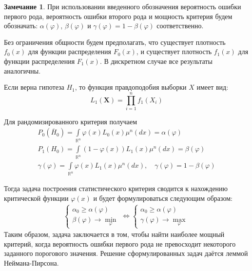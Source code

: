 \documentclass[oneside,final,14pt]{extreport}
\theoremstyle{plain}
\theoremstyle{definition}
\newtheorem*{rmrk}{Замечание}
\theoremstyle{named}
\begin{document}
\begin{rmrk}
При использовании введенного обозначения вероятность ошибки первого рода, вероятность ошибки второго рода и мощность критерия будем обозначать: $\alpha(\varphi)$, $\beta(\varphi)$ и $\gamma(\varphi)=1-\beta(\varphi)$ соответственно.
\end{rmrk}

Без ограничения общности будем предполагать, что существует плотность $f_{0}(x)$ для функции распределения $F_{0}(x)$, и существует плотность $f_{1}(x)$ для функции распределения $F_{1}(x)$. В дискретном случае все результаты аналогичны.

Если верна гипотеза $H_1$, то функция правдоподобия выборки $X$ имеет вид:
\begin{equation*}
    L_{1}\left(\mathbf{X}\right)=\prod_{i=1}^{n} f_{1}\left(X_{i}\right)
\end{equation*}

Для рандомизированного критерия получаем
\begin{gather*}
    P_{0}\left(\bar{H}_{0}\right)=\int\limits_{\mathbb{R}^{n}} \varphi(x) L_{0}(x) \mu^{n}(d x)=\alpha(\varphi) \\
    P_{1}\left(H_{0}\right)=\int\limits_{\mathbb{R}^{n}}(1-\varphi(x)) L_{1}(x) \mu^{n}(d x)=\beta(\varphi) \\
    \gamma(\varphi)=\int\limits_{\mathbb{R}^{n}} \varphi(x) L_{1}(x) \mu^{n}(d x), \quad \gamma(\varphi)=1-\beta(\varphi)
\end{gather*}

Тогда задача построения статистического критерия сводится к нахождению критической функции $\varphi(x)$ и будет формулироваться следующим образом:
\begin{equation*}
    \begin{array}{l}
    \left\{\begin{array}{l}
    \alpha_{0} \geqslant \alpha(\varphi) \\
    \beta(\varphi) \rightarrow \min\limits_{\varphi}
    \end{array}\right.
    \Leftrightarrow
    \left\{\begin{array}{l}
    \alpha_{0} \geqslant \alpha(\varphi) \\
    \gamma(\varphi) \rightarrow \max\limits_{\varphi}
    \end{array}\right.
    \end{array}
\end{equation*}
Таким образом, задача заключается в том, чтобы найти наиболее мощный критерий, когда вероятность ошибки первого рода не превосходит некоторого заданного порогового значения. Решение сформулированных задач даётся леммой Неймана-Пирсона.
\end{document}
